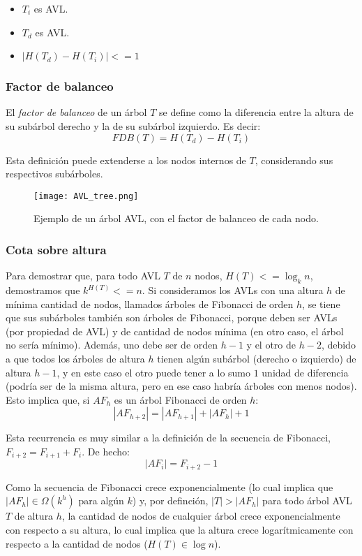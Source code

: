 \documentclass{article}
\newcommand{\BigOmega}[1]{{\Omega(#1)}}
\begin{document}
\begin{itemize}
    \item $T_i$ es AVL.
    \item $T_d$ es AVL.
    \item $|H(T_d) - H(T_i)| <= 1$
\end{itemize}

\subsubsection{Factor de balanceo}

El \textit{factor de balanceo} de un árbol $T$ se define como la diferencia entre la altura de su subárbol derecho y la de su subárbol izquierdo. Es decir:
$$FDB(T) = H(T_d) - H(T_i)$$

Esta definición puede extenderse a los nodos internos de $T$, considerando sus respectivos subárboles.

\begin{figure}[H]
    \centering
    \texttt{[image: AVL\_tree.png]}
    \caption*{Ejemplo de un árbol AVL, con el factor de balanceo de cada nodo.}
\end{figure}

\subsubsection{Cota sobre altura}

Para demostrar que, para todo AVL $T$ de $n$ nodos, $H(T) <= \log_k{n}$, demostramos que $k^{H(T)} <= n$. Si consideramos los AVLs con una altura $h$ de mínima cantidad de nodos, llamados árboles de Fibonacci de orden $h$, se tiene que sus subárboles también son árboles de Fibonacci, porque deben ser AVLs (por propiedad de AVL) y de cantidad de nodos mínima (en otro caso, el árbol no sería mínimo). Además, uno debe ser de orden $h - 1$ y el otro de $h - 2$, debido a que todos los árboles de altura $h$ tienen algún subárbol (derecho o izquierdo) de altura $h - 1$, y en este caso el otro puede tener a lo sumo $1$ unidad de diferencia (podría ser de la misma altura, pero en ese caso habría árboles con menos nodos). Esto implica que, si $AF_h$ es un árbol Fibonacci de orden $h$:
$$|AF_{h+2}| = |AF_{h+1}| + |AF_h| + 1$$

Esta recurrencia es muy similar a la definición de la secuencia de Fibonacci, $F_{i+2} = F_{i+1} + F_i$. De hecho:
$$|AF_i| = F_{i+2} - 1$$

Como la secuencia de Fibonacci crece exponencialmente (lo cual implica que $|AF_h| \in \BigOmega{k^h}$ para algún $k$) y, por definción, $|T| > |AF_h|$ para todo árbol AVL $T$ de altura $h$, la cantidad de nodos de cualquier árbol crece exponencialmente con respecto a su altura, lo cual implica que la altura crece logarítmicamente con respecto a la cantidad de nodos ($H(T) \in \log{n}$).
\end{document}
